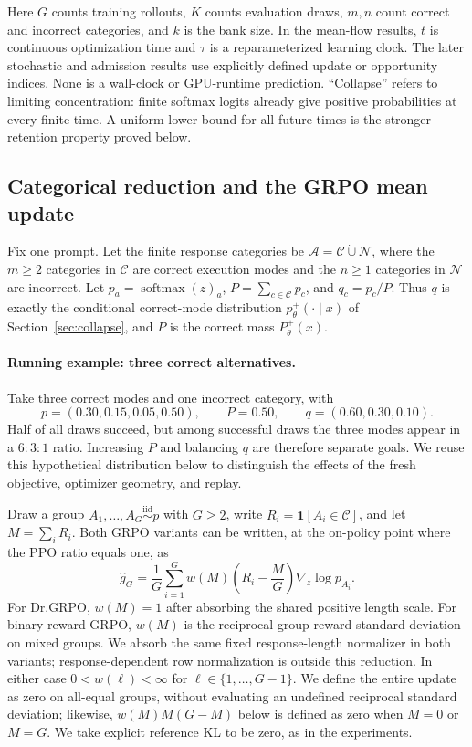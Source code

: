 \documentclass{article}
\newcommand{\1}{\mathbf 1}
\theoremstyle{remark}
\theoremstyle{definition}
\theoremstyle{plain}
\begin{document}
Here $G$ counts training rollouts, $K$ counts evaluation draws, $m,n$ count
correct and incorrect categories, and $k$ is the bank size. In the mean-flow results, $t$ is
continuous optimization time and $\tau$ is a reparameterized learning clock.
The later stochastic and admission results use explicitly defined update or
opportunity indices. None is a wall-clock or GPU-runtime prediction. ``Collapse'' refers to
limiting concentration: finite softmax logits already give positive
probabilities at every finite time. A uniform lower bound for all future
times is the stronger retention property proved below.

\subsection{Categorical reduction and the GRPO mean update}
\label{app:theory-grpo-mean}

Fix one prompt. Let the finite response categories be
$\mathcal A=\mathcal C\mathbin{\dot\cup}\mathcal N$, where the $m\ge2$
categories in $\mathcal C$ are correct execution modes and the $n\ge1$
categories in $\mathcal N$ are incorrect. Let
$p_a=\operatorname{softmax}(z)_a$, $P=\sum_{c\in\mathcal C}p_c$, and
$q_c=p_c/P$. Thus $q$ is exactly the conditional correct-mode distribution
$p_\theta^+(\cdot\mid x)$ of Section~\ref{sec:collapse}, and $P$ is the correct
mass $P_\theta^+(x)$.

\paragraph{Running example: three correct alternatives.}
\label{ex:theory-running}
Take three correct modes and one incorrect category, with
\[
 p=(0.30,0.15,0.05,0.50),\qquad P=0.50,\qquad q=(0.60,0.30,0.10).
\]
Half of all draws succeed, but among successful draws the three modes appear
in a $6{:}3{:}1$ ratio. Increasing $P$ and balancing $q$ are therefore
separate goals. We reuse this hypothetical distribution below to distinguish
the effects of the fresh objective, optimizer geometry, and replay.

Draw a group $A_1,\ldots,A_G\stackrel{\mathrm{iid}}{\sim}p$ with $G\ge2$,
write $R_i=\1[A_i\in\mathcal C]$, and let $M=\sum_iR_i$. Both GRPO variants
can be written, at the on-policy point where the PPO ratio equals one, as
\begin{equation}
  \widehat g_G
  =\frac1G\sum_{i=1}^G
   w(M)\left(R_i-\frac{M}{G}\right)\nabla_z\log p_{A_i}.
  \label{eq:group-estimator}
\end{equation}
For Dr.GRPO, $w(M)=1$ after absorbing the shared positive length scale. For
binary-reward GRPO, $w(M)$ is the reciprocal group reward standard deviation
on mixed groups. We absorb the same fixed response-length normalizer in both
variants; response-dependent row normalization is outside this reduction.
In either case $0<w(\ell)<\infty$ for $\ell\in\{1,\ldots,G-1\}$.
We define the entire update as zero on all-equal groups, without evaluating an
undefined reciprocal standard deviation; likewise, $w(M)M(G-M)$ below is
defined as zero when $M=0$ or $M=G$. We take explicit reference KL to be zero, as
in the experiments.
\end{document}
